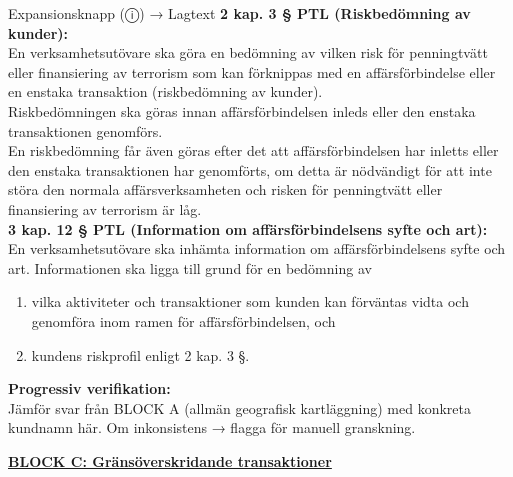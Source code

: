 \documentclass[10pt]{beamer}
\begin{document}
\begin{frame}[label=riskfragor-steg2]
\begin{alertblock}{Expansionsknapp (ⓘ) → Lagtext}
    \tiny \textbf{2 kap. 3 § PTL (Riskbedömning av kunder):}\\
    \tiny En verksamhetsutövare ska göra en bedömning av vilken risk för penningtvätt eller finansiering av terrorism
    som kan förknippas med en affärsförbindelse eller en enstaka transaktion (riskbedömning av kunder).\\
    \tiny Riskbedömningen ska göras innan affärsförbindelsen inleds eller den enstaka transaktionen genomförs.\\
    \tiny En riskbedömning får även göras efter det att affärsförbindelsen har inletts eller den enstaka transaktionen
    har genomförts, om detta är nödvändigt för att inte störa den normala affärsverksamheten och risken för penningtvätt
    eller finansiering av terrorism är låg.\\[0.1cm]
    
    \tiny \textbf{3 kap. 12 § PTL (Information om affärsförbindelsens syfte och art):}\\
    \tiny En verksamhetsutövare ska inhämta information om affärsförbindelsens syfte och art.
    Informationen ska ligga till grund för en bedömning av
    \begin{enumerate}
      \item vilka aktiviteter och transaktioner som kunden kan förväntas vidta och genomföra inom ramen för affärsförbindelsen, och
      \item kundens riskprofil enligt 2 kap. 3 §.
    \end{enumerate}
    \vspace{0.1cm}
    
    \tiny \textbf{Progressiv verifikation:}\\
    \tiny Jämför svar från BLOCK A (allmän geografisk kartläggning) med konkreta kundnamn här.
    Om inkonsistens → flagga för manuell granskning.
  \end{alertblock}

  \vspace{0.4cm}

  \textbf{\underline{BLOCK C: Gränsöverskridande transaktioner}}

  \vspace{0.2cm}


\end{frame}
\end{document}

